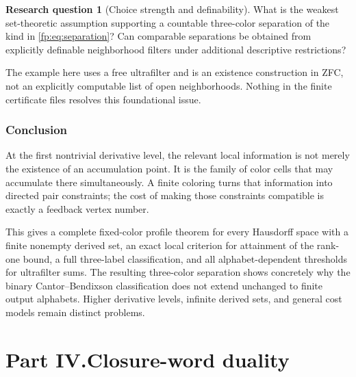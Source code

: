 \documentclass[11pt,letterpaper]{article}
\numberwithin{equation}{section}
\theoremstyle{definition}
\theoremstyle{remark}
\theoremstyle{definition}
\newtheorem{question}{Research question}
\begin{document}
\begin{question}[Choice strength and definability]\label{fp:q:choice}
What is the weakest set-theoretic assumption supporting a countable
three-color separation of the kind in \cref{fp:eq:separation}? Can comparable
separations be obtained from explicitly definable neighborhood filters under
additional descriptive restrictions?
\end{question}
The example here uses a free ultrafilter and is an existence construction
in ZFC, not an explicitly computable list of open neighborhoods. Nothing
in the finite certificate files resolves this foundational issue.

\section{Conclusion}
\label{fp:sec:conclusion}

At the first nontrivial derivative level, the relevant local information is
not merely the existence of an accumulation point. It is the family of
color cells that may accumulate there simultaneously. A finite coloring
turns that information into directed pair constraints; the cost of making
those constraints compatible is exactly a feedback vertex number.

This gives a complete fixed-color profile theorem for every Hausdorff space
with a finite nonempty derived set, an exact local criterion for attainment
of the rank-one bound, a full three-label classification, and all
alphabet-dependent thresholds for ultrafilter sums. The resulting
three-color separation shows concretely why the binary
Cantor--Bendixson classification does not extend unchanged to finite output
alphabets. Higher derivative levels, infinite derived sets, and general
cost models remain distinct problems.


\clearpage
{}\part*{Part IV.\quad Closure-word duality}
\end{document}
